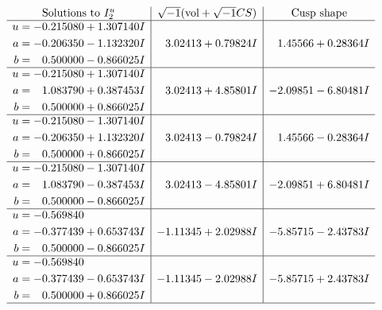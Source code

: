 \documentclass[1p]{elsarticle_modified}
\theoremstyle{definition}
\newcommand{\I}{\sqrt{-1}}
\begin{document}
$$\begin{array}{c|c|c}  
\text{Solutions to }I^u_{2}& \I (\text{vol} + \sqrt{-1}CS) & \text{Cusp shape}\\
 \hline 
\begin{aligned}
u &= -0.215080 + 1.307140 I \\
a &= -0.206350 - 1.132320 I \\
b &= \phantom{-}0.500000 - 0.866025 I\end{aligned}
 & \phantom{-}3.02413 + 0.79824 I & \phantom{-}1.45566 + 0.28364 I \\ \hline\begin{aligned}
u &= -0.215080 + 1.307140 I \\
a &= \phantom{-}1.083790 + 0.387453 I \\
b &= \phantom{-}0.500000 + 0.866025 I\end{aligned}
 & \phantom{-}3.02413 + 4.85801 I & -2.09851 - 6.80481 I \\ \hline\begin{aligned}
u &= -0.215080 - 1.307140 I \\
a &= -0.206350 + 1.132320 I \\
b &= \phantom{-}0.500000 + 0.866025 I\end{aligned}
 & \phantom{-}3.02413 - 0.79824 I & \phantom{-}1.45566 - 0.28364 I \\ \hline\begin{aligned}
u &= -0.215080 - 1.307140 I \\
a &= \phantom{-}1.083790 - 0.387453 I \\
b &= \phantom{-}0.500000 - 0.866025 I\end{aligned}
 & \phantom{-}3.02413 - 4.85801 I & -2.09851 + 6.80481 I \\ \hline\begin{aligned}
u &= -0.569840\phantom{ +0.000000I} \\
a &= -0.377439 + 0.653743 I \\
b &= \phantom{-}0.500000 - 0.866025 I\end{aligned}
 & -1.11345 + 2.02988 I & -5.85715 - 2.43783 I \\ \hline\begin{aligned}
u &= -0.569840\phantom{ +0.000000I} \\
a &= -0.377439 - 0.653743 I \\
b &= \phantom{-}0.500000 + 0.866025 I\end{aligned}
 & -1.11345 - 2.02988 I & -5.85715 + 2.43783 I\\
 \hline 
 \end{array}$$\newpage
\end{document}
